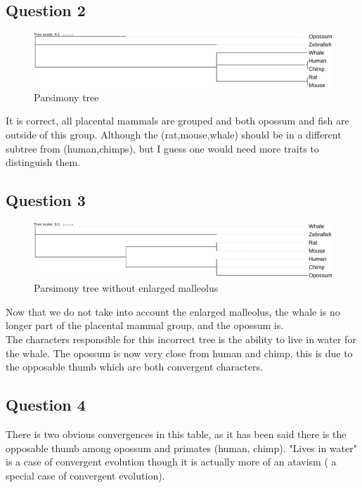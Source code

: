 \documentclass[]{article}
\theoremstyle{definition}
\begin{document}
\subsection{Question 2}
\begin{figure}[h!]
	\includegraphics*[width = \linewidth]{../ex3/PARS.pdf}
	\caption{\label{nj2} Parsimony tree }
\end{figure}
It is correct, all placental mammals are grouped and both opossum and fish are outside of this group. Although the (rat,mouse,whale) should be in a different subtree from (human,chimps), but I guess one would need more traits to distinguish them. 
\subsection{Question 3}
\begin{figure}[h!]
	\includegraphics*[width = \linewidth]{../ex3/PARS2.pdf}
	\caption{\label{nj2} Parsimony tree without enlarged malleolus }
\end{figure}
Now that we do not take into account the enlarged malleolus, the whale is no longer part of the placental mammal group, and the opossum is.\\
The characters responsible for this incorrect tree is the ability to live in water for the whale. The opossum is now very close from human and chimp, this is due to the opposable thumb which are both convergent characters.\\

\subsection{Question 4}
There is two obvious convergences in this table, as it has been said there is the opposable thumb among opossum and primates (human, chimp).
"Lives in water" is a case of convergent evolution though it is actually more of an atavism ( a special case of convergent evolution).\\
\end{document}
